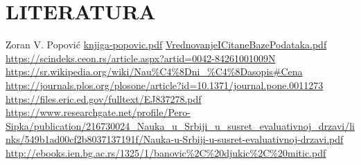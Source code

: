 \documentclass[12pt,a4paper]{article}
\begin{document}
\section{LITERATURA}
\begin{enumerate}
 \setcounter{enumi}{0}
  \renewcommand{\labelenumi}{[\arabic{enumi}]}
  
  Zoran V. Popović \href{http://www.solid.phy.bg.ac.rs/publications/knjiga-popovic.pdf}{knjiga-popovic.pdf}
    \quad
    \href{https://kobson.nb.rs/upload/documents/oNamaPredavanja/PR2008Seminar4casVrednovanjeICitaneBazePodataka.pdf}{VrednovanjeICitaneBazePodataka.pdf}
    \quad
     \url{https://scindeks.ceon.rs/article.aspx?artid=0042-84261001009N}\\
    \quad
     \url{https://sr.wikipedia.org/wiki/Nau%C4%8Dni_%C4%8Dasopis#Cena}\\
    \quad
    \url{https://journals.plos.org/plosone/article?id=10.1371/journal.pone.0011273}\\
    \quad
     \url {https://files.eric.ed.gov/fulltext/EJ837278.pdf}\\
    \quad
    \url {https://www.researchgate.net/profile/Pero-Sipka/publication/216730024_Nauka_u_Srbiji_u_susret_evaluativnoj_drzavi/links/549b1ad00cf2b8037137191f/Nauka-u-Srbiji-u-susret-evaluativnoj-drzavi.pdf}\\
    \quad
    \url{http://ebooks.ien.bg.ac.rs/1325/1/banovic%2C%20djukic%2C%20mitic.pdf}\\
    \quad
  

    \end{enumerate}
\end{document}
